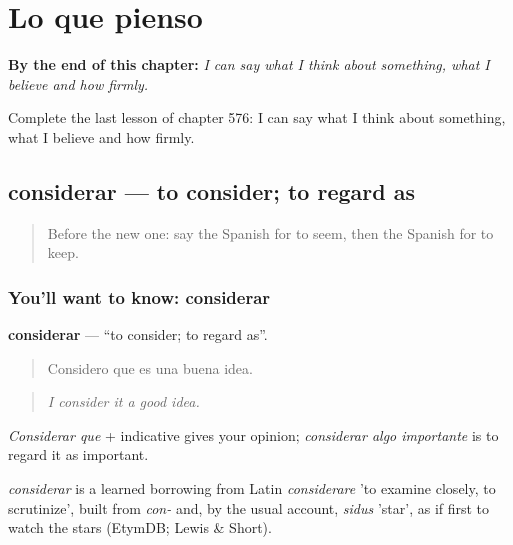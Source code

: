 
\chapter{Lo que pienso}
\label{ch:es-lo-que-pienso}

\begin{chapteropening}
\textbf{By the end of this chapter:} \emph{I can say what I think about something, what I believe and how firmly.}

Complete the last lesson of chapter 576: I can say what I think about something, what I believe and how firmly.
\end{chapteropening}

\section[considerar]{considerar — to consider; to regard as}

\label{lesson:ES-C576-considerar}



\begin{quote}
Before the new one: say the Spanish for to seem, then the Spanish for to keep.
\end{quote}

\subsection*{You'll want to know: considerar}
\textbf{considerar} — \textquotedblleft{}to consider; to regard as\textquotedblright{}.

\begin{quote}
Considero que es una buena idea.
\end{quote}

\begin{quote}
\emph{I consider it a good idea.}
\end{quote}

\emph{Considerar que} + indicative gives your opinion; \emph{considerar algo importante} is to regard it as important.

\begin{cousinweb}
\emph{considerar} is a learned borrowing from Latin \emph{considerare} 'to examine closely, to scrutinize', built from \emph{con-} and, by the usual account, \emph{sidus} 'star', as if first to watch the stars (EtymDB; Lewis \& Short).
\end{cousinweb}

